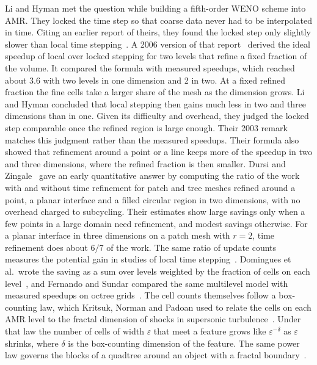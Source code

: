 \documentclass[12pt]{article}
\theoremstyle{remark}
\begin{document}
Li and Hyman met the question while building a fifth-order WENO scheme into AMR. They locked the time step so that coarse data never had to be interpolated in time. Citing an earlier report of theirs, they found the locked step only slightly slower than local time stepping~\cite{li2003adaptive}. A 2006 version of that report~\cite{li2006local} derived the ideal speedup of local over locked stepping for two levels that refine a fixed fraction of the volume. It compared the formula with measured speedups, which reached about 3.6 with two levels in one dimension and 2 in two. At a fixed refined fraction the fine cells take a larger share of the mesh as the dimension grows. Li and Hyman concluded that local stepping then gains much less in two and three dimensions than in one. Given its difficulty and overhead, they judged the locked step comparable once the refined region is large enough. Their 2003 remark matches this judgment rather than the measured speedups. Their formula also showed that refinement around a point or a line keeps more of the speedup in two and three dimensions, where the refined fraction is then smaller. Dursi and Zingale~\cite{dursi2005efficiency} gave an early quantitative answer by computing the ratio of the work with and without time refinement for patch and tree meshes refined around a point, a planar interface and a filled circular region in two dimensions, with no overhead charged to subcycling. Their estimates show large savings only when a few points in a large domain need refinement, and modest savings otherwise. For a planar interface in three dimensions on a patch mesh with $r=2$, time refinement does about $6/7$ of the work. The same ratio of update counts measures the potential gain in studies of local time stepping~\cite{dumbser2014arbitrary,domingues2008adaptive,seny2014efficient}. Domingues et al.\ wrote the saving as a sum over levels weighted by the fraction of cells on each level~\cite{domingues2008adaptive}, and Fernando and Sundar compared the same multilevel model with measured speedups on octree grids~\cite{fernando2022scalable}. The cell counts themselves follow a box-counting law, which Kritsuk, Norman and Padoan used to relate the cells on each AMR level to the fractal dimension of shocks in supersonic turbulence~\cite{kritsuk2006adaptive}. Under that law the number of cells of width $\varepsilon$ that meet a feature grows like $\varepsilon^{-\delta}$ as $\varepsilon$ shrinks, where $\delta$ is the box-counting dimension of the feature. The same power law governs the blocks of a quadtree around an object with a fractal boundary~\cite{faloutsos1996analysis}.
\end{document}
